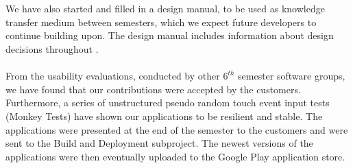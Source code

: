 \\\\
We have also started and filled in a design manual, to be used as knowledge transfer medium between semesters, which we expect future \giraf developers to continue building upon. The design manual includes information about design decisions throughout \giraf.  
\\\\
From the usability evaluations, conducted by other $6^{th}$ semester software groups, we have found that our contributions were accepted by the customers. Furthermore, a series of unstructured pseudo random touch event input tests (Monkey Tests) have shown our applications to be resilient and stable. The applications were presented at the end of the semester to the customers and were sent to the Build and Deployment subproject. The newest versions of the applications were then eventually uploaded to the Google Play application store. 
